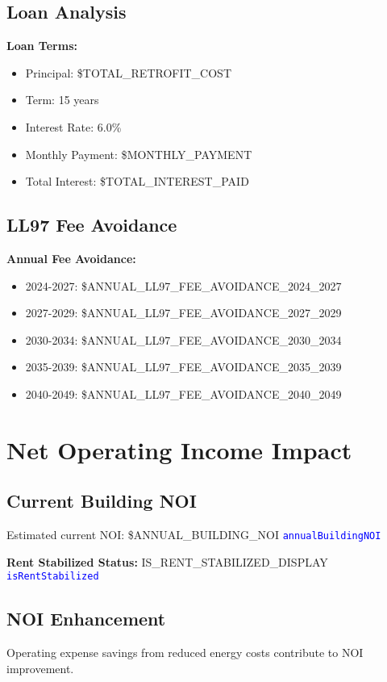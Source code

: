 \documentclass[11pt,letterpaper]{article}
\newcommand{\code}[1]{\textcolor{blue}{\texttt{#1}}}
\begin{document}
\subsection{Loan Analysis}
\textbf{Loan Terms:}
\begin{itemize}
\item Principal: \${{TOTAL_RETROFIT_COST}}
\item Term: 15 years
\item Interest Rate: 6.0\%
\item Monthly Payment: \${{MONTHLY_PAYMENT}}
\item Total Interest: \${{TOTAL_INTEREST_PAID}}
\end{itemize}

\subsection{LL97 Fee Avoidance}
\textbf{Annual Fee Avoidance:}
\begin{itemize}
\item 2024-2027: \${{ANNUAL_LL97_FEE_AVOIDANCE_2024_2027}}
\item 2027-2029: \${{ANNUAL_LL97_FEE_AVOIDANCE_2027_2029}}
\item 2030-2034: \${{ANNUAL_LL97_FEE_AVOIDANCE_2030_2034}}
\item 2035-2039: \${{ANNUAL_LL97_FEE_AVOIDANCE_2035_2039}}
\item 2040-2049: \${{ANNUAL_LL97_FEE_AVOIDANCE_2040_2049}}
\end{itemize}

\section{Net Operating Income Impact}

\subsection{Current Building NOI}
Estimated current NOI: \${{ANNUAL_BUILDING_NOI}} \quad \code{annualBuildingNOI}

\textbf{Rent Stabilized Status:} {{IS_RENT_STABILIZED_DISPLAY}} \quad \code{isRentStabilized}

\subsection{NOI Enhancement}
Operating expense savings from reduced energy costs contribute to NOI improvement.
\end{document}
